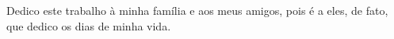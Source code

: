 Dedico este trabalho à minha família e aos meus amigos, pois é a eles, de fato, que dedico os dias de minha vida.